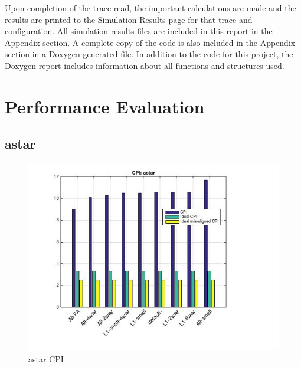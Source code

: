 \documentclass[11pt,titlepage]{article}
\begin{document}
    Upon completion of the trace read, the important calculations are made and the results are printed to the Simulation Results page for that trace and configuration. All simulation results files are included in this report in the Appendix section. A complete copy of the code is also included in the Appendix section in a Doxygen generated file. In addition to the code for this project, the Doxygen report includes information about all functions and structures used.

\section{Performance Evaluation}
 
    \subsection{astar}
        \begin{figure}[H]
            \centering
            \includegraphics[scale=0.75]{CPIastar}
            \caption{astar CPI}
            \label{fig:CPIastar}
        \end{figure}
\end{document}
